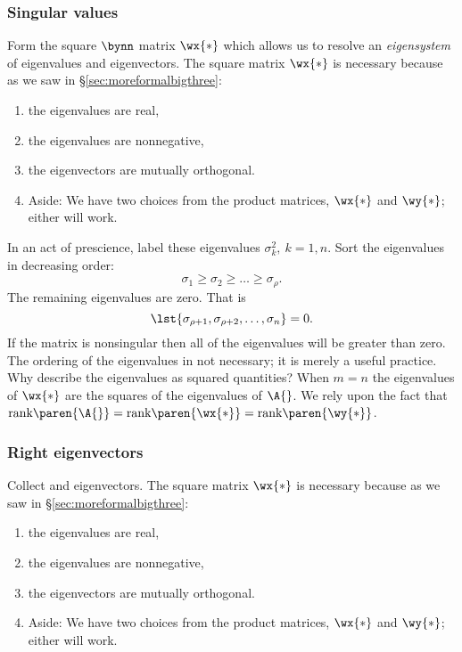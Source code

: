 \subsubsection{Singular values} Form the square $\bynn$ matrix $\wx{*}$ which allows us to resolve an \emph{eigensystem} of eigenvalues and eigenvectors. The square matrix $\wx{*}$ is necessary because as we saw in \S\eqref{sec:moreformalbigthree}:
\begin{enumerate}
%
\item the eigenvalues are real,
\item the eigenvalues are nonnegative,
\item the eigenvectors are mutually orthogonal.
\item Aside: We have two choices from the product matrices, $\wx{*}$ and $\wy{*}$; either will work.
%
\end{enumerate}
In an act of prescience, label these eigenvalues $\sigma_{k}^{2},\ k=1,n$. Sort the eigenvalues in decreasing order:
\begin{equation}
  \sigma_{1} \ge \sigma_{2} \ge \dots \ge \sigma_{\rho}.
\end{equation}
\subitem The remaining eigenvalues are zero. That is
\begin{equation}
  \lst{ \sigma_{\rho+1}, \sigma_{\rho+2}, \dots, \sigma_{n} } = 0.
\end{equation}
\subitem If the matrix is nonsingular then all of the eigenvalues will be greater than zero.
\subitem The ordering of the eigenvalues in not necessary; it is merely a useful practice.
\subitem Why describe the eigenvalues as squared quantities? When $m=n$ the eigenvalues of $\wx{*}$ are the squares of the eigenvalues of $\A{}$.
\subitem We rely upon the fact that $\text{rank}\paren{\A{}} = \text{rank}\paren{\wx{*}} = \text{rank}\paren{\wy{*}}$.%
%
\subsubsection{Right eigenvectors} Collect and eigenvectors. The square matrix $\wx{*}$ is necessary because as we saw in \S\eqref{sec:moreformalbigthree}:
\begin{enumerate}
%
\item the eigenvalues are real,
\item the eigenvalues are nonnegative,
\item the eigenvectors are mutually orthogonal.
\item Aside: We have two choices from the product matrices, $\wx{*}$ and $\wy{*}$; either will work.
%
\end{enumerate}
